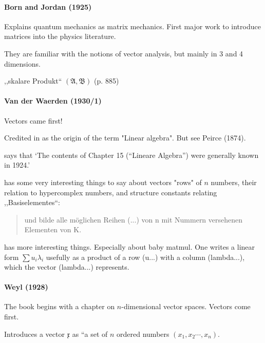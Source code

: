 \paragraph{Born and Jordan (1925)~\cite{Born1925}}

Explains quantum mechanics as matrix mechanics. First major work to introduce matrices into the physics literature.

They are familiar with the notions of vector analysis, but mainly in 3 and 4 dimensions.

,,skalare Produkt`` $(\mathfrak A, \mathfrak B)$ (p. 885)



\paragraph{Van der Waerden (1930/1)~\cite{vdWaerden1930,vdWaerden1931}}

Vectors came first!


Credited in \cite{Kleiner2007} as the origin of the term "Linear algebra". But see
Peirce (1874).

\cite[p. 36]{vdWaerden1975} says that `The contents of Chapter 15 (``Lineare Algebra'') were generally
known in 1924.'


\cite[\S 10, pp. 43-44]{vdWaerden1930} has some very interesting things to say about vectors "rows" of $n$ numbers,
their relation to hypercomplex numbers, and structure constants relating ,,Basiselementes``:

\begin{quote}
und bilde alle möglichen Reihen (...) von n
mit Nummern versehenen Elementen von K.


\end{quote}

\cite[\S 104, pp. 110. ff.]{vdWaerden1931} has more interesting things.
Especially about baby matmul.
One writes a linear form $\sum u_i \lambda_i$ usefully as a product of a row (u...) with a column (lambda...), which the vector (lambda...) represents.



\paragraph{Weyl (1928)~\cite{Weyl1928,Weyl1931}}

The book begins with a chapter on $n$-dimensional vector spaces.
Vectors come first.

Introduces a vector $\mathfrak x$ as ``a set of $n$ ordered numbers $(x_1, x_2 \cdots, x_n)$.

